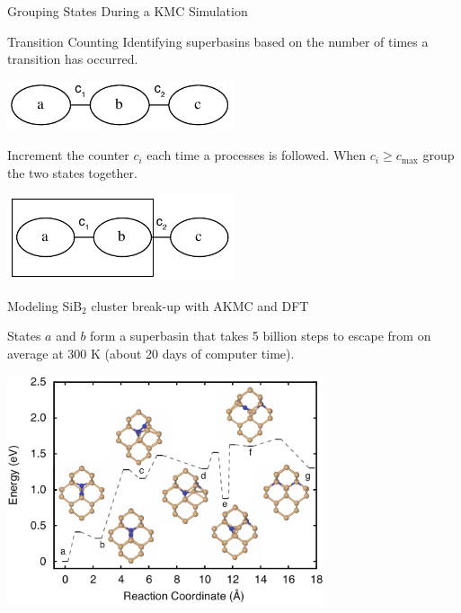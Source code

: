\documentclass[onlymath]{beamer}
\begin{document}
\begin{frame}{Grouping States During a KMC Simulation}

  \begin{block}{Transition Counting}
    Identifying superbasins based on the number of times a transition has
    occurred.
  \end{block}

  \begin{center}
    \includegraphics[width=0.5\textwidth]{images/tc.pdf}
  \end{center}

  Increment the counter $c_i$ each time a processes is followed. When
  $c_i \geq c_\mathrm{max}$ group the two states together.

  \begin{center}
    \includegraphics[width=0.5\textwidth]{images/tc2.pdf}
  \end{center}

\end{frame}

\begin{frame}{Modeling SiB$_2$ cluster break-up with AKMC and DFT}

States $a$ and $b$ form a superbasin that takes 5 billion steps to escape from on average at 300 K (about 20 days of computer time).

  \begin{center}
    \includegraphics[width=0.7\textwidth]{images/sib2i-pes}
  \end{center}

\end{frame}
\end{document}
